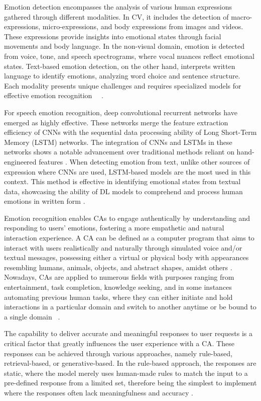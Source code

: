 \documentclass[runningheads]{llncs}
\begin{document}
Emotion detection encompasses the analysis of various human expressions gathered through different modalities. In CV, it includes the detection of macro-expressions, micro-expressions, and body expressions from images and videos. These expressions provide insights into emotional states through facial movements and body language. In the non-visual domain, emotion is detected from voice, tone, and speech spectrograms, where vocal nuances reflect emotional states. Text-based emotion detection, on the other hand, interprets written language to identify emotions, analyzing word choice and sentence structure. Each modality presents unique challenges and requires specialized models for effective emotion recognition \cite{Chul2018}~\cite{Trigeorgis2016}~\cite{Karna2020}.

For speech emotion recognition, deep convolutional recurrent networks have emerged as highly effective. These networks merge the feature extraction efficiency of CNNs with the sequential data processing ability of Long Short-Term Memory (LSTM) networks. The integration of CNNs and LSTMs in these networks shows a notable advancement over traditional methods reliant on hand-engineered features \cite{Trigeorgis2016}. When detecting emotion from text, unlike other sources of expression where CNNs are used, LSTM-based models are the most used in this context. This method is effective in identifying emotional states from textual data, showcasing the ability of DL models to comprehend and process human emotions in written form \cite{Karna2020}.

Emotion recognition enables CAs to engage authentically by understanding and responding to users' emotions, fostering a more empathetic and natural interaction experience. A CA  can be defined as a computer program that aims to interact with users realistically and naturally through simulated voice and/or textual messages, possessing either a virtual or physical body with appearances resembling humans, animals, objects, and abstract shapes, amidst others \cite{aljaroodi_avatars_2019}. Nowadays, CAs are applied to numerous fields with purposes ranging from entertainment, task completion, knowledge seeking, and in some instances automating previous human tasks, where they can either initiate and hold interactions in a particular domain and switch to another anytime or be bound to a single domain \cite{fernandes_survey_2020}~\cite{ramesh_survey_2017}.

The capability to deliver accurate and meaningful responses to user requests is a critical factor that greatly influences the user experience with a CA. These responses can be achieved through various approaches, namely rule-based, retrieval-based, or generative-based. In the rule-based approach, the responses are static, where the model merely uses human-made rules to match the input to a pre-defined response from a limited set, therefore being the simplest to implement where the responses often lack meaningfulness and accuracy \cite{mohamad_suhaili_service_2021}. 
\end{document}
